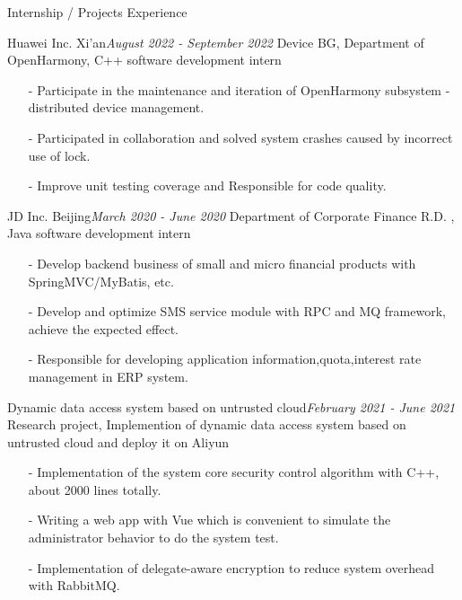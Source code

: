 \documentclass{resume} %
\begin{document}
\begin{rSection}{Internship / Projects Experience}

\begin{rSubsection}{Huawei Inc. Xi'an}{\em August 2022 - September 2022}
{Device BG, Department of OpenHarmony, C++ software development intern}
{}
    \item[]
    \begin{itemize}
    \setlength\itemsep{-0.5em}
        \item[-] Participate in the maintenance and iteration of OpenHarmony subsystem - distributed device management.
        \item[-] Participated in collaboration and solved system crashes caused by incorrect use of lock.
        \item[-] Improve unit testing coverage and Responsible for code quality.
    \end{itemize}
\end{rSubsection}


\begin{rSubsection}{JD Inc. Beijing}{\em March 2020 - June 2020}
{Department of Corporate Finance R.D. , Java software development intern}
{}
    \item[]
    \begin{itemize}
    \setlength\itemsep{-0.5em}
        \item[-] Develop backend business of small and micro financial products with SpringMVC/MyBatis, etc.
        \item[-] Develop and optimize SMS service module with RPC and MQ framework, achieve the expected effect.
        \item[-] Responsible for developing application information,quota,interest rate management in ERP system.
    \end{itemize}
\end{rSubsection}


\begin{rSubsection}{Dynamic data access system based on untrusted cloud}{\em February 2021 - June 2021}
{Research project, Implemention of dynamic data access system based on untrusted cloud and deploy it on Aliyun}
{}
    \item[]
    \begin{itemize}
    \setlength\itemsep{-0.5em}
        \item[-] Implementation of the system core security control algorithm with C++, about 2000 lines totally.
        \item[-] Writing a web app with Vue which is convenient to simulate the administrator behavior to do the system test.
        \item[-] Implementation of delegate-aware encryption to reduce system overhead with RabbitMQ.
    \end{itemize}
\end{rSubsection}


\end{rSection}
\end{document}
